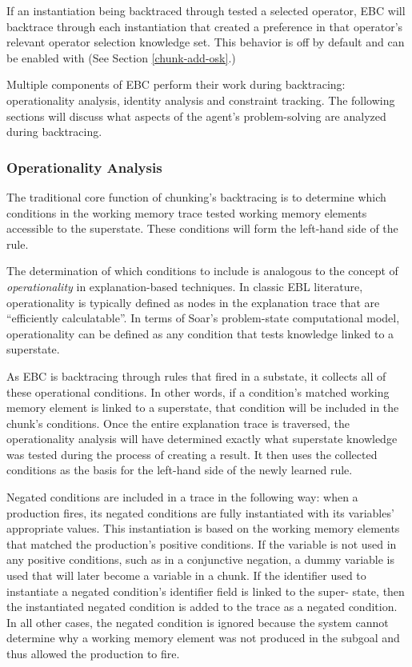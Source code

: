 If an instantiation being backtraced through tested a selected operator, EBC will backtrace through each instantiation that created a preference in that operator's relevant operator selection knowledge set.  This behavior is off by default and can be enabled with  (See Section \ref{chunk-add-osk}.)

Multiple components of EBC perform their work during backtracing:  operationality analysis, identity analysis and constraint tracking.  The following sections will discuss what aspects of the agent's problem-solving are analyzed during backtracing.

\subsubsection{Operationality Analysis}
\label{CHUNKING-during-backtracing-operationality}

The traditional core function of chunking's backtracing is to determine which conditions in the working memory trace tested working memory elements accessible to the superstate.  These conditions will form the left-hand side of the rule.

The determination of which conditions to include is analogous to the concept of \textit{operationality} in explanation-based techniques. In classic EBL literature, operationality is typically defined as nodes in the explanation trace that are ``efficiently calculatable''.  In terms of Soar's problem-state computational model, operationality can be defined as any condition that tests knowledge linked to a superstate.  

As EBC is backtracing through rules that fired in a substate, it collects all of these operational conditions.  In other words, if a condition's matched working memory element is linked to a superstate, that condition will be included in the chunk's conditions.  Once the entire explanation trace is traversed, the operationality analysis will have determined exactly what superstate knowledge was tested during the process of creating a result. It then uses the collected conditions as the basis for the left-hand side of the newly learned rule.  

Negated conditions are included in a trace in the following way: when a production fires, its negated conditions are fully instantiated with its variables' appropriate values. This instantiation is based on the working memory elements that matched the production's positive conditions. If the variable is not used in any positive conditions, such as in a conjunctive negation, a dummy variable is used that will later become a variable in a chunk.  If the identifier used to instantiate a negated condition's identifier field is linked to the super- state, then the instantiated negated condition is added to the trace as a negated condition. In all other cases, the negated condition is ignored because the system cannot determine why a working memory element was not produced in the subgoal and thus allowed the production to fire. 

